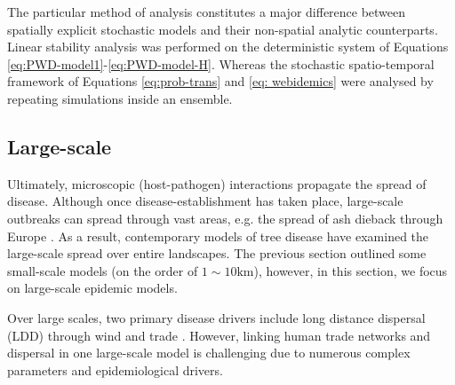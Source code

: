 The particular method of analysis constitutes a major difference between spatially explicit stochastic models 
and their non-spatial analytic counterparts. Linear stability analysis was performed on the deterministic system
of Equations \ref{eq:PWD-model1}-\ref{eq:PWD-model-H}. Whereas the stochastic spatio-temporal framework of Equations
\ref{eq:prob-trans} and \ref{eq: webidemics} were analysed by repeating simulations inside an ensemble.



\subsection{Large-scale}

Ultimately, microscopic (host-pathogen) interactions propagate the spread of disease. 
Although once disease-establishment has taken place, large-scale outbreaks can spread through vast
areas, e.g. the spread of ash dieback through Europe \cite{alsop2015ash}.
As a result, contemporary models of tree disease have examined the large-scale spread over entire landscapes.
The previous section outlined some small-scale models (on the order of $1 \sim 10 \mathrm{km}$), 
however, in this section, we focus on large-scale epidemic models.

Over large scales, two primary disease drivers include long distance dispersal (LDD) through wind \cite{golan2017long, gross2014h} and
trade \cite{ash-dieback-costs, perrings2016options, harwood2009epidemiological, doi:10.1098/rsif.2005.0051}.
However, linking human trade networks and dispersal in one large-scale model is challenging due to numerous complex parameters 
and epidemiological drivers. 

